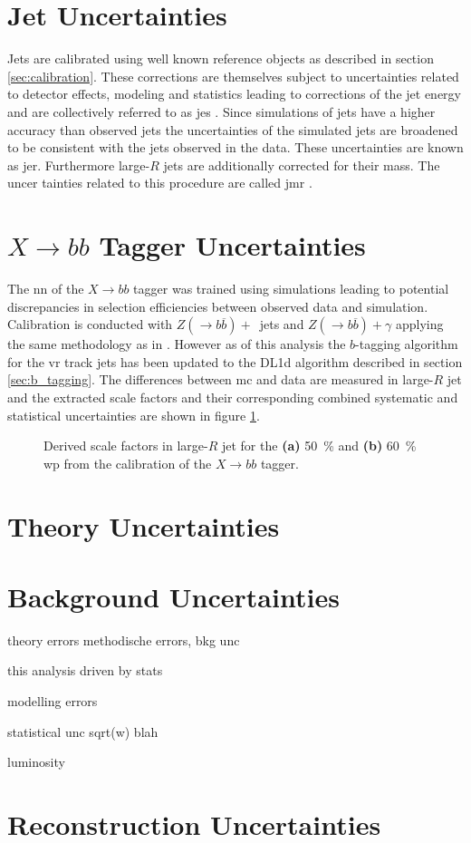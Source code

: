 \section{Jet Uncertainties}
Jets are calibrated using well known reference objects as described in section \ref{sec:calibration}. These corrections are themselves subject to uncertainties related to detector effects, modeling and statistics leading to corrections of the jet energy and are collectively referred to as \ac{jes} \citep{atlas2021jet,Aaboud:2019aa}. Since simulations of jets have a higher accuracy than observed jets the uncertainties of the simulated jets are broadened to be consistent with the jets observed in the data. These uncertainties are known as \ac{jer}. Furthermore large-$R$ jets are additionally corrected for their mass. The uncer tainties related to this procedure are called \ac{jmr} \citep{ATLAS-CONF-2020-022}.

\section{$X\rightarrow bb$ Tagger Uncertainties}
The \ac{nn} of the $X\rightarrow bb$ tagger was trained using simulations leading to potential discrepancies in selection efficiencies between observed data and simulation. Calibration is conducted with $Z(\rightarrow b\overline{b})+$~jets and $Z(\rightarrow b\overline{b})+\gamma$ applying the same methodology as in \citep{ATL-PHYS-PUB-2021-035}. However as of this analysis the $b$-tagging algorithm for the \ac{vr} track jets has been updated to the DL1d algorithm described in section \ref{sec:b_tagging}. The differences between \ac{mc} and data are measured in large-$R$ jet \pt and the extracted scale factors and their corresponding combined systematic and statistical uncertainties are shown in figure \ref{fig:xbb_sf}.
\begin{figure} 
    \centering
\caption[]{Derived scale factors in large-$R$ jet \pt for the \textbf{(a)} \qty[]{50}{\percent} and \textbf{(b)} \qty[]{60}{\percent} \ac{wp} from the calibration of the $X\rightarrow bb$ tagger.}
\label{fig:xbb_sf}    
\end{figure}

\section{Theory Uncertainties}

\section{Background Uncertainties}







theory errors
methodische errors, bkg unc

this analysis driven by stats

modelling errors

statistical unc sqrt(w) blah

luminosity

\section{Reconstruction Uncertainties}
